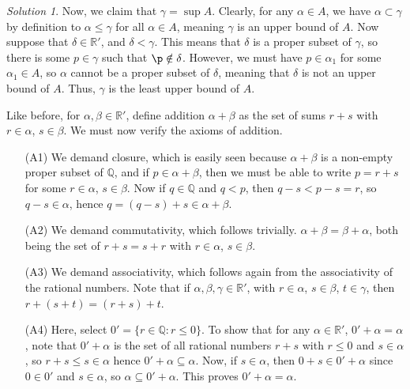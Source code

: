 \documentclass[11pt]{report}
\def\R{\mathbb{R}}
\def\Q{\mathbb{Q}}
\theoremstyle{remark}
\newtheorem*{solution}{Solution}
\begin{document}
\begin{solution}
        Now, we claim that $\gamma = \sup A$. Clearly, for any $\alpha \in A$, we
        have $\alpha \subset \gamma$ by definition to $\alpha \leq \gamma$ for all
        $\alpha \in A$, meaning $\gamma$ is an upper bound of $A$. Now suppose that
        $\delta \in \R'$, and $\delta < \gamma$. This means that $\delta$ is a
        proper subset of $\gamma$, so there is some $p \in \gamma$ such that $\p
        \notin \delta$. However, we must have $p \in \alpha_1$ for some $\alpha_1
        \in A$, so $\alpha$ cannot be a proper subset of $\delta$, meaning that
        $\delta$ is not an upper bound of $A$. Thus, $\gamma$ is the least upper
        bound of $A$.

        Like before, for $\alpha, \beta \in \R'$, define addition $\alpha + \beta$
        as the set of sums $r + s$ with $r \in \alpha$, $s \in \beta$. We must now
        verify the axioms of addition. 
        \begin{itemize}
            \item[(A1)] We demand closure, which is easily seen because $\alpha +
            \beta$ is a non-empty proper subset of $\Q$, and if $p \in \alpha +
            \beta$, then we must be able to write $p = r + s$ for some $r \in
            \alpha$, $s \in \beta$. Now if $q \in \Q$ and $q < p$, then $q - s < p -
            s = r$, so $q - s \in \alpha$, hence $q = (q - s) + s \in \alpha +
            \beta$. 

            \item[(A2)] We demand commutativity, which follows trivially. $\alpha +
            \beta = \beta + \alpha$, both being the set of $r + s = s + r$ with $r
            \in \alpha$, $s \in \beta$. 

            \item[(A3)] We demand associativity, which follows again from the
            associativity of the rational numbers. Note that if $\alpha, \beta,
            \gamma \in \R'$, with $r \in \alpha$, $s \in \beta$, $t \in \gamma$,
            then $r + (s + t) = (r + s) + t$. 

            \item[(A4)] Here, select $0' = \{r \in \Q: r \leq 0\}$. To show that for
            any $\alpha \in \R'$, $0' + \alpha = \alpha$, note that $0' + \alpha$ is
            the set of all rational numbers $r + s$ with $r \leq 0$ and $s \in
            \alpha$, so $r + s \leq s \in \alpha$ hence $0' + \alpha \subseteq
            \alpha$. Now, if $s \in \alpha$, then $0 + s \in 0' + \alpha$ since $0
            \in 0'$ and $s \in \alpha$, so $\alpha \subseteq 0' + \alpha$. This
            proves $0' + \alpha = \alpha$. 


\end{itemize}
\end{solution}
\end{document}
